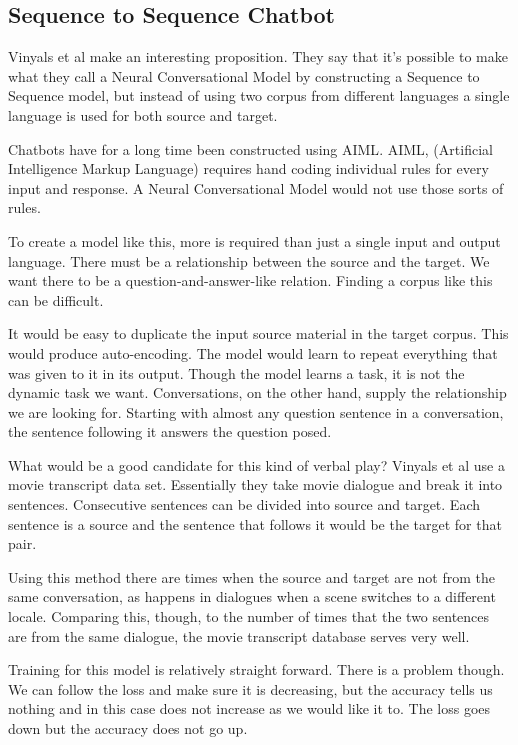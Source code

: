 \subsection{Sequence to Sequence Chatbot}

Vinyals et al \cite{DBLP:journals/corr/VinyalsL15} make an interesting proposition. They say that it's possible to make what they call a Neural Conversational Model by constructing a Sequence to Sequence model, but instead of using two corpus from different languages a single language is used for both source and target.

Chatbots have for a long time been constructed using \ac{AIML}. AIML, (Artificial Intelligence Markup Language) requires hand coding individual rules for every input and response. A Neural Conversational Model would not use those sorts of rules.

To create a model like this, more is required than just a single input and output language. There must be a relationship between the source and the target. We want there to be a question-and-answer-like relation. Finding a corpus like this can be difficult.

It would be easy to duplicate the input source material in the target corpus. This would produce auto-encoding. The model would learn to repeat everything that was given to it in its output. Though the model learns a task, it is not the dynamic task we want. Conversations, on the other hand, supply the relationship we are looking for. Starting with almost any question sentence in a conversation, the sentence following it answers the question posed. 

What would be a good candidate for this kind of verbal play? Vinyals et al \cite{DBLP:journals/corr/VinyalsL15} use a movie transcript data set. Essentially they take movie dialogue and break it into sentences. Consecutive sentences can be divided into source and target. Each sentence is a source and the sentence that follows it would be the target for that pair. 

Using this method there are times when the source and target are not from the same conversation, as happens in dialogues when a scene switches to a different locale. Comparing this, though, to the number of times that the two sentences are from the same dialogue, the movie transcript database serves very well.

Training for this model is relatively straight forward. There is a problem though. We can follow the loss and make sure it is decreasing, but the accuracy tells us nothing and in this case does not increase as we would like it to. The loss goes down but the accuracy does not go up.

